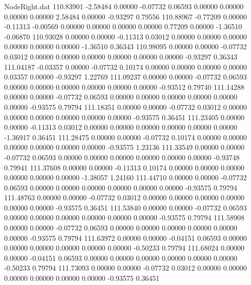 \begin{filecontents}{NodeRight.dat}
 110.83901   -2.58484    0.00000    -0.07732    0.06593    0.00000    0.00000    0.00000    0.00000    2.58484    0.00000   -0.93297    0.79556
 110.88967   -0.77209    0.00000    -0.11313   -0.00569    0.00000    0.00000    0.00000    0.00000    0.77209    0.00000   -1.36510   -0.06870
 110.93028    0.00000    0.00000    -0.11313    0.03012    0.00000    0.00000    0.00000    0.00000    0.00000    0.00000   -1.36510    0.36343
 110.98095    0.00000    0.00000    -0.07732    0.03012    0.00000    0.00000    0.00000    0.00000    0.00000    0.00000   -0.93297    0.36343
 111.04187   -0.03357    0.00000    -0.07732    0.10174    0.00000    0.00000    0.00000    0.00000    0.03357    0.00000   -0.93297    1.22769
 111.09237    0.00000    0.00000    -0.07732    0.06593    0.00000    0.00000    0.00000    0.00000    0.00000    0.00000   -0.93512    0.79740
 111.14288    0.00000    0.00000    -0.07732    0.06593    0.00000    0.00000    0.00000    0.00000    0.00000    0.00000   -0.93575    0.79794
 111.18351    0.00000    0.00000    -0.07732    0.03012    0.00000    0.00000    0.00000    0.00000    0.00000    0.00000   -0.93575    0.36451
 111.23405    0.00000    0.00000    -0.11313    0.03012    0.00000    0.00000    0.00000    0.00000    0.00000    0.00000   -1.36917    0.36451
 111.28475    0.00000    0.00000    -0.07732    0.10174    0.00000    0.00000    0.00000    0.00000    0.00000    0.00000   -0.93575    1.23136
 111.33549    0.00000    0.00000    -0.07732    0.06593    0.00000    0.00000    0.00000    0.00000    0.00000    0.00000   -0.93748    0.79941
 111.37608    0.00000    0.00000    -0.11313    0.10174    0.00000    0.00000    0.00000    0.00000    0.00000    0.00000   -1.38057    1.24160
 111.44710    0.00000    0.00000    -0.07732    0.06593    0.00000    0.00000    0.00000    0.00000    0.00000    0.00000   -0.93575    0.79794
 111.48763    0.00000    0.00000    -0.07732    0.03012    0.00000    0.00000    0.00000    0.00000    0.00000    0.00000   -0.93575    0.36451
 111.53840    0.00000    0.00000    -0.07732    0.06593    0.00000    0.00000    0.00000    0.00000    0.00000    0.00000   -0.93575    0.79794
 111.58908    0.00000    0.00000    -0.07732    0.06593    0.00000    0.00000    0.00000    0.00000    0.00000    0.00000   -0.93575    0.79794
 111.63972    0.00000    0.00000    -0.04151    0.06593    0.00000    0.00000    0.00000    0.00000    0.00000    0.00000   -0.50233    0.79794
 111.68024    0.00000    0.00000    -0.04151    0.06593    0.00000    0.00000    0.00000    0.00000    0.00000    0.00000   -0.50233    0.79794
 111.73093    0.00000    0.00000    -0.07732    0.03012    0.00000    0.00000    0.00000    0.00000    0.00000    0.00000   -0.93575    0.36451

\end{filecontents}
